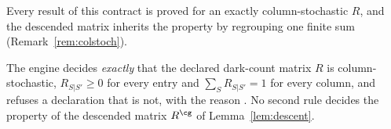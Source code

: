 
Every result of this contract is proved for an exactly column-stochastic $R$,
and the descended matrix inherits the property by regrouping one finite sum
(Remark~\ref{rem:colstoch}).

\begin{requirement}\label{req:column-stochastic-refusal}
The engine decides \emph{exactly} that the declared dark-count matrix $R$ is
column-stochastic, $R_{S|S'}\ge0$ for every entry and $\sum_SR_{S|S'}=1$ for
every column, and refuses a declaration that is not, with the reason
. No second rule decides the
property of the descended matrix $R^{\cg}$ of Lemma~\ref{lem:descent}.
\end{requirement}
